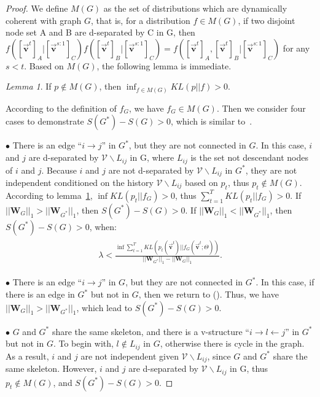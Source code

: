 \documentclass[conference]{IEEEtran}
\theoremstyle{definition}
\theoremstyle{theorem}
\theoremstyle{proof}
\theoremstyle{remark}
\newtheorem{lemma}{Lemma}[section]
\begin{document}
\begin{proof}
	We define $M(G)$ as the set of distributions which are dynamically coherent with graph $G$, that is, for a distribution $f\in M(G)$, if two disjoint node set A and B are d-separated by C in G, then $f([\vec{\bm{v}}^t]_A|[\vec{\bm{v}}^{s:1}]_C)f([\vec{\bm{v}}^t]_B|[\vec{\bm{v}}^{s:1}]_C) = f([\vec{\bm{v}}^t]_A, [\vec{\bm{v}}^t]_B|[\vec{\bm{v}}^{s:1}]_C)$ for any $s<t$. Based on $M(G)$, the following lemma is immediate.
	\begin{lemma}\label{lm}
	  If $p\not \in M(G)$, then $\inf_{f\in M(G)}KL(p||f)>0$.
	\end{lemma}
	According to the definition of $f_{G}$, we have $f_{G}\in M(G)$. Then we consider four cases to demonstrate $S(G^*) - S(G) > 0$, which is similar to~\cite{brouillard2020differentiable}.
	

	$\bullet$ There is an edge ``$i\rightarrow j$'' in $G^*$, but they are not connected in $G$.
	In this case, $i$ and $j$ are d-separated by $\mathcal{V}\backslash L_{ij}$ in G, where $L_{ij}$ is the set not descendant nodes of $i$ and $j$.
	Because $i$ and $j$ are not d-separated by $\mathcal{V}\backslash L_{ij}$ in $G^*$, they are not independent conditioned on the history $\mathcal{V}\backslash L_{ij}$ based on $p_t$, thus $p_t\not\in M(G)$.
	According to lemma~\ref{lm}, $\inf KL(p_t||f_{G})>0$, thus $\sum_{t=1}^T KL(p_t||f_{G})>0$.
	If $||\bm{W}_G||_{1}>||\bm{W}_{G^*}||_{1}$, then $S(G^*) - S(G) > 0$.
	If $||\bm{W}_G||_{1}<||\bm{W}_{G^*}||_{1}$, then $S(G^*) - S(G) > 0$, when: 
	\begin{eqnarray}\label{note}
		\begin{aligned}
				\lambda< \frac{\inf \sum_{t=1}^T KL(p_t(\vec{\bm{v}}^t)||f_{G}(\vec{\bm{v}}^t;\Theta))}{||\bm{W}_{G^*}||_{1}- ||\bm{W}_{G}||_{1}}.
		\end{aligned}
	\end{eqnarray}
	
    $\bullet$  There is an edge ``$i\rightarrow j$'' in $G$, but they are not connected in $G^*$.
	In this case, if there is an edge in $G^*$ but not in $G$, then we return to ().
	Thus, we have $||\bm{W}_G||_{1}>||\bm{W}_{G^*}||_{1}$, which lead to $S(G^*) - S(G) > 0$.
	
	$\bullet$  $G$ and $G^*$ share the same skeleton, and there is a v-structure ``$i\rightarrow l \leftarrow j$'' in $G^*$ but not in $G$.
	To begin with, $l\not\in L_{ij}$ in $G$, otherwise there is cycle in the graph.
	As a result, $i$ and $j$ are not independent given $\mathcal{V}\backslash L_{ij}$, since $G$ and $G^*$ share the same skeleton.
	However, $i$ and $j$ are d-separated by $\mathcal{V}\backslash L_{ij}$ in G, thus $p_t\not\in M(G)$, and $S(G^*) - S(G) > 0$.
	

\end{proof}
\end{document}
